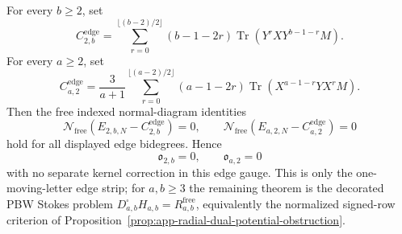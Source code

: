 \begin{prop}
\label{prop:app-edge-pbw-telescoping}
  For every \(b\geq2\), set
  \[
    C^{\mathrm{edge}}_{2,b}
    =
    \sum_{r=0}^{\lfloor(b-2)/2\rfloor}
      (b-1-2r)\operatorname{Tr}(Y^rXY^{b-1-r}M).
  \]
  For every \(a\geq2\), set
  \[
    C^{\mathrm{edge}}_{a,2}
    =
    \frac3{a+1}
    \sum_{r=0}^{\lfloor(a-2)/2\rfloor}
      (a-1-2r)\operatorname{Tr}(X^{a-1-r}YX^rM).
  \]
  Then the free indexed normal-diagram identities
  \[
    \mathcal N_{\mathrm{free}}
      (E_{2,b,N}-C^{\mathrm{edge}}_{2,b})=0,
    \qquad
    \mathcal N_{\mathrm{free}}
      (E_{a,2,N}-C^{\mathrm{edge}}_{a,2})=0
  \]
  hold for all displayed edge bidegrees.  Hence
  \[
    \mathfrak o_{2,b}=0,\qquad
    \mathfrak o_{a,2}=0
  \]
  with no separate kernel correction in this edge gauge.  This is only
  the one-moving-letter edge strip; for \(a,b\geq3\) the remaining
  theorem is the decorated PBW Stokes problem
  \(D^\square_{a,b}H_{a,b}=R^{\mathrm{free}}_{a,b}\), equivalently the
  normalized signed-row criterion of
  Proposition~\ref{prop:app-radial-dual-potential-obstruction}.
\end{prop}

